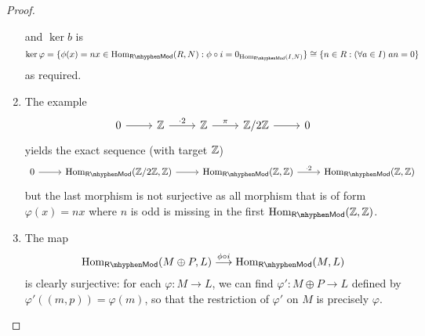 \begin{proof}
\begin{enumerate}[label=(\roman*)]
\[    \]
    and $\ker b$ is
    \[
    \ker \varphi = \{\phi(x)=nx \in \Hom_\mathsf{R\mhyphen Mod}(R, N): \phi \circ i = 0_{\Hom_\mathsf{R\mhyphen Mod}(I, N)}\} \cong \{n \in R: (\forall a \in I)\; an = 0\}
    \]
    as required.
    \item The example
    \[
    \begin{tikzcd}
    0 \arrow[r] &\Z \arrow[r, "\cdot 2"] &\Z \arrow[r, "\pi"] &\Z/2\Z \arrow[r] &0
    \end{tikzcd}
    \]
    yields the exact sequence (with target $\mathbb{Z}$)
    \[
    \begin{tikzcd}
    0 \arrow[r] &\Hom_\mathsf{R\mhyphen Mod}(\Z/2\Z,\Z) \arrow[r] &\Hom_\mathsf{R\mhyphen Mod}(\Z,\Z) \arrow[r, "\cdot 2"] &\Hom_\mathsf{R\mhyphen Mod}(\Z,\Z)
    \end{tikzcd}
    \]
    but the last morphism is not surjective as all morphism that is of form $\varphi(x) = nx$ where $n$ is odd is missing in the first $\Hom_\mathsf{R\mhyphen Mod}(\Z,\Z)$.
    \item The map
    \[
    \Hom_\mathsf{R\mhyphen Mod}(M\oplus P,L) \overset{\phi \circ i}{\longrightarrow} \Hom_\mathsf{R\mhyphen Mod}(M,L)
    \]
    is clearly surjective: for each $\varphi: M \to L$, we can find $\varphi': M\oplus P \to L$ defined by $\varphi'((m,p)) = \varphi(m)$, so that the restriction of $\varphi'$ on $M$ is precisely $\varphi$.
\end{enumerate}
\end{proof}

